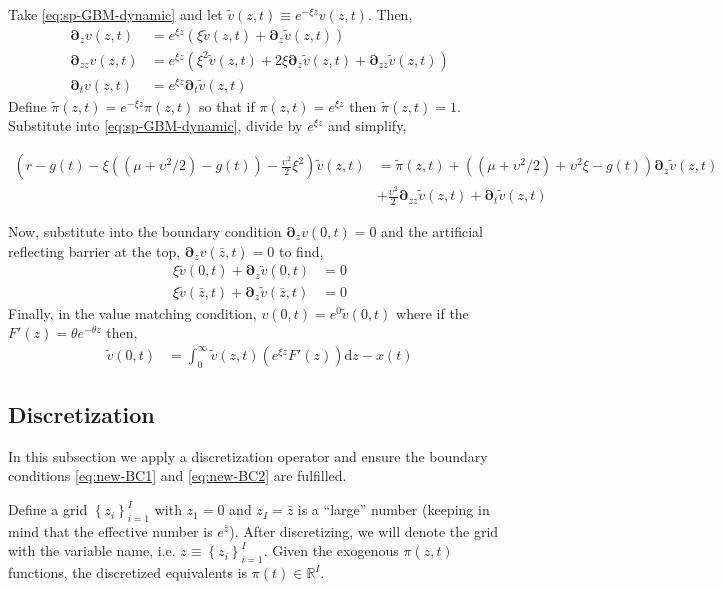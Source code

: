 \documentclass[11pt]{article}
\newcommand{\D}[1][]{\ensuremath{\boldsymbol{\partial}_{#1}}}
\newcommand{\R}{\ensuremath{\mathbb{R}}}
\newcommand{\diff}{\ensuremath{\mathrm{d}}}
\newcommand{\set}[1]{\ensuremath{\left\{{#1}\right\}}}
\begin{document}
Take \cref{eq:sp-GBM-dynamic} and let $\tilde{v}(z,t) \equiv e^{-\xi z}v(z,t)$.  Then,
\begin{align}
	\D[z]v(z,t) &= e^{\xi z}\left(\xi\tilde{v}(z,t) + \D[z]\tilde{v}(z,t) \right)\\
	\D[zz]v(z,t) &= e^{\xi z}\left(\xi^{2}\tilde{v}(z,t) + 2 \xi\D[z]\tilde{v}(z,t) + \D[zz]\tilde{v}(z,t)  \right)\\	
	\D[t]v(z,t) &= e^{\xi z} \D[t] \tilde{v}(z,t)
\end{align}
Define $\tilde{\pi}(z,t) = e^{-\xi z}\pi(z,t)$ so that if $\pi(z,t) = e^{\xi z}$ then $\tilde{\pi}(z,t) = 1$.  Substitute into \cref{eq:sp-GBM-dynamic}, divide by $e^{\xi z}$ and simplify,

\begin{align}
	\left(r - g(t)- \xi((\mu + \upsilon^2/2)-g(t)) - \frac{\upsilon^2}{2}\xi^2\right) \tilde{v}(z,t) &= \tilde{\pi}(z,t) + ((\mu + \upsilon^2/2) + \upsilon^2\xi - g(t)) \D[z] \tilde{v}(z,t) \nonumber \\ &+ \tfrac{\upsilon^2}{2} \D[zz] \tilde{v}(z,t) + \D[t]\tilde{v}(z,t)  \label{eq:bellman-GBM-dynamic-normalized}
\end{align}

Now, substitute into the boundary condition $\D[z]v(0,t) = 0$ and the artificial reflecting barrier at the top, $\D[z]v(\bar{z},t) = 0$ to find,
\begin{align}
	\xi\tilde{v}(0,t) + \D[z]\tilde{v}(0,t ) &= 0\label{eq:new-BC1}\\
	\xi\tilde{v}(\bar{z},t) + \D[z]\tilde{v}(\bar{z},t) &= 0\label{eq:new-BC2}
\end{align}	
Finally, in the value matching condition, $v(0,t) = e^{0}\tilde{v}(0,t)$ where if the $F'(z) = \theta e^{-\theta z}$ then,
\begin{align}
	\tilde{v}(0,t) &= \int_{0}^{\infty} \tilde{v}(z,t) \left(e^{\xi z} F'(z)\right) \diff z - x(t)\label{eq:vm-GBM-dynamic-normalized}
\end{align}	

\subsection{Discretization}

In this subsection we apply a discretization operator and ensure the boundary conditions \cref{eq:new-BC1} and \cref{eq:new-BC2} are fulfilled. 

Define a  grid $\set{z_i}_{i=1}^I$ with $z_1 = 0$ and $z_I = \bar{z}$ is a ``large'' number (keeping in mind that the effective number is $e^{\bar{z}}$).  After discretizing, we will denote the grid with the variable name, i.e. $z \equiv \set{z_i}_{i=1}^I$.  Given the exogenous $\pi(z,t)$ functions, the discretized equivalents is $\pi(t) \in \R^I$.
\end{document}
